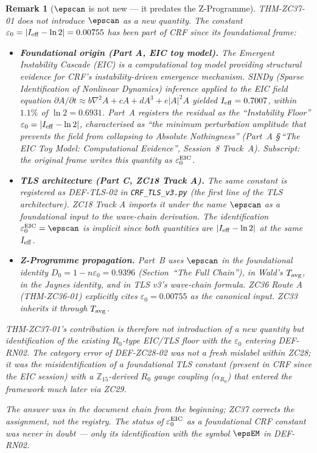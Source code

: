 \documentclass[12pt, a4paper]{article}
\newtheorem{remark}{Remark}[section]
\begin{document}
\begin{remark}[$\epscan$ is not new --- it predates the Z-Programme]
\label{rem:eps-not-new}
THM-ZC37-01 does not introduce $\epscan$ as a new quantity.
The constant $\varepsilon_0 = |I_{\rm eff} - \ln 2| = 0.00755$
has been part of CRF since its foundational frame:

\begin{itemize}[leftmargin=*, noitemsep]
  \item \textbf{Foundational origin (Part A, EIC toy model).}
    The Emergent Instability Cascade (EIC) is a computational
    toy model providing structural evidence for CRF's
    instability-driven emergence mechanism. SINDy
    (Sparse Identification of Nonlinear Dynamics) inference
    applied to the EIC field equation
    $\partial A/\partial t \approx b\nabla^2 A + cA + dA^3
    + e|A|^2 A$ yielded $I_{\rm eff} = 0.7007$, within
    $1.1\%$ of $\ln 2 = 0.6931$. Part~A registers the
    residual as the ``Instability Floor''
    $\varepsilon_0 = |I_{\rm eff} - \ln 2|$, characterised
    as ``the minimum perturbation amplitude that prevents
    the field from collapsing to Absolute Nothingness''
    (Part~A \S\,``The EIC Toy Model: Computational
    Evidence'', Session~8 Track~A).
    Subscript: the original frame writes this quantity as
    $\varepsilon_0^{\rm EIC}$.
  \item \textbf{TLS architecture (Part C, ZC18 Track A).}
    The same constant is registered as DEF-TLS-02 in
    \texttt{CRF\_TLS\_v3.py} (the first line of the TLS
    architecture). ZC18 Track A imports it under the name
    $\epscan$ as a foundational input to the wave-chain
    derivation. The identification
    $\varepsilon_0^{\rm EIC} = \epscan$ is implicit since
    both quantities are $|I_{\rm eff} - \ln 2|$ at the same
    $I_{\rm eff}$.
  \item \textbf{Z-Programme propagation.}
    Part~B uses $\epscan$ in the foundational identity
    $D_0 = 1 - n\varepsilon_0 = 0.9396$ (Section~``The Full
    Chain''), in Wald's $T_{\rm avg}$, in the Jaynes
    identity, and in TLS v3's wave-chain formula. ZC36 Route A
    (THM-ZC36-01) explicitly cites $\varepsilon_0 = 0.00755$
    as the canonical input. ZC33 inherits it through
    $T_{\rm avg}$.
\end{itemize}

THM-ZC37-01's contribution is therefore not introduction of a
new quantity but \emph{identification of the existing
$R_0$-type EIC/TLS floor with the $\varepsilon_0$ entering
DEF-RN02}. The category error of DEF-ZC28-02 was not a fresh
mislabel within ZC28; it was the misidentification of a
foundational TLS constant (present in CRF since the EIC
session) with a $\mathbb{Z}_{15}$-derived $R_0$ gauge coupling
($\alpha_{R_0}$) that entered the framework much later via
ZC29.

The answer was in the document chain from the beginning;
ZC37 corrects the assignment, not the registry. The status of
$\varepsilon_0^{\rm EIC}$ as a foundational CRF constant was
never in doubt --- only its identification with the symbol
$\epsEM$ in DEF-RN02.
\end{remark}
\end{document}
